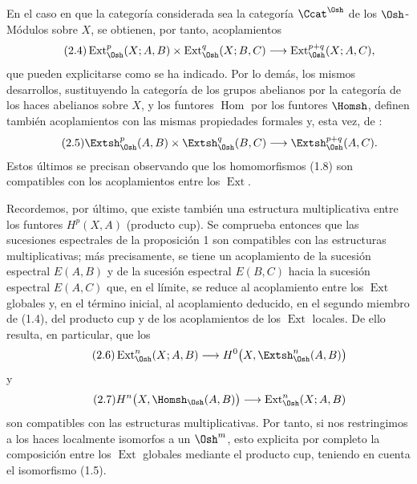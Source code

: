 En el caso en que la categoría considerada sea la categoría $\Ccat^{\Osh}$ de los
$\Osh$-Módulos sobre $X$, se obtienen, por tanto, acoplamientos
\begin{equation}\tag{2.4}
  \operatorname{Ext}_{\Osh}^{p}(X;A,B)
  \times\operatorname{Ext}_{\Osh}^{q}(X;B,C)
  \longrightarrow\operatorname{Ext}_{\Osh}^{p+q}(X;A,C),
\end{equation}
que pueden explicitarse como se ha indicado. Por lo demás, los mismos
desarrollos, sustituyendo la categoría de los grupos abelianos por la
categoría de los haces abelianos sobre $X$, y los funtores $\operatorname{Hom}$
por los funtores $\Homsh$, definen también acoplamientos con las mismas
propiedades formales y, esta vez, de :
\begin{equation}\tag{2.5}
  \Extsh_{\Osh}^{p}(A,B)\times\Extsh_{\Osh}^{q}(B,C)
  \longrightarrow\Extsh_{\Osh}^{p+q}(A,C).
\end{equation}
Estos últimos se precisan observando que los homomorfismos (1.8) son
compatibles con los acoplamientos entre los $\operatorname{Ext}$.

Recordemos, por último, que existe también una estructura multiplicativa entre los funtores
$H^{p}(X,A)$ (producto cup). Se comprueba entonces que las sucesiones espectrales de la
proposición 1 son compatibles con las estructuras multiplicativas; más
precisamente, se tiene un acoplamiento de la sucesión espectral $E(A,B)$ y de la sucesión
espectral $E(B,C)$ hacia la sucesión espectral $E(A,C)$ que, en el límite,
se reduce al acoplamiento entre los $\operatorname{Ext}$ globales y, en el
término inicial, al acoplamiento deducido, en el segundo miembro de (1.4), del
producto cup y de los acoplamientos de los $\operatorname{Ext}$ locales. De ello resulta,
en particular, que los 
\begin{equation}\tag{2.6}
  \operatorname{Ext}_{\Osh}^{n}(X;A,B)
  \longrightarrow H^{0}\bigl(X,\Extsh_{\Osh}^{n}(A,B)\bigr)
\end{equation}
y
\begin{equation}\tag{2.7}
  H^{n}\bigl(X,\Homsh_{\Osh}(A,B)\bigr)
  \longrightarrow\operatorname{Ext}_{\Osh}^{n}(X;A,B)
\end{equation}
son compatibles con las estructuras multiplicativas. Por tanto, si nos restringimos a los
haces localmente isomorfos a un $\Osh^{m}$, esto explicita por completo la
composición entre los $\operatorname{Ext}$ globales mediante el producto cup, teniendo
en cuenta el isomorfismo (1.5).

